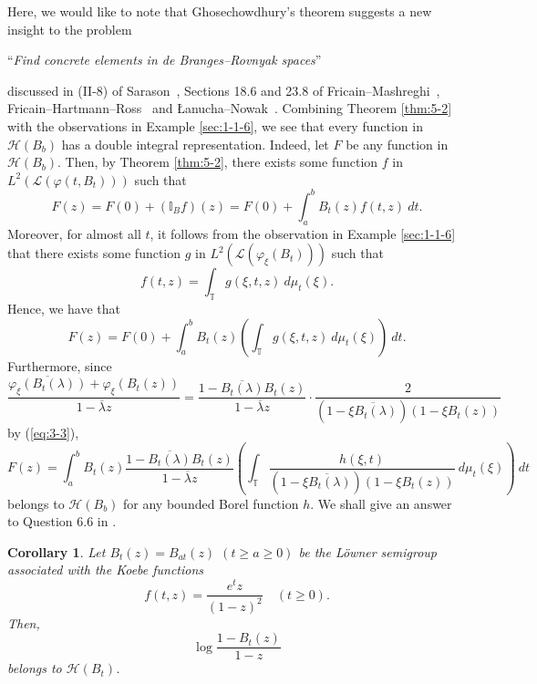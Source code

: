 \documentclass[12pt]{article}
\newtheorem{cor}[thm]{Corollary}
\numberwithin{equation}{section}
\newcommand{\cL}{{\mathcal L}}
\newcommand{\bT}{{\mathbb T}}
\newcommand{\bI}{{\mathbb I}}
\newcommand{\cH}{{\mathcal H}}
\newcommand{\lam}{\lambda}
\begin{document}
Here, we would like to note that 
Ghosechowdhury's theorem suggests a new insight to the problem 
\begin{center}
``\textit{Find concrete elements in de Branges--Rovnyak spaces}''
\end{center}
discussed in (II-8) of Sarason~\cite{Sarason}, Sections 18.6 and 23.8 of Fricain--Mashreghi~\cite{FM}, Fricain--Hartmann--Ross~\cite{FHR} and {\L}anucha--Nowak~\cite{LN}. 
Combining 
Theorem \ref{thm:5-2} with 
the observations in Example \ref{sec:1-1-6}, 
we see that every function in $\cH(B_{b})$ has a double integral representation. 
Indeed, let $F$ be any function in $\cH(B_b)$. 
Then, by Theorem \ref{thm:5-2}, 
there exists some function $f$ in $L^2(\cL(\varphi(t,B_{t})))$ such that  
\[
F(z)=F(0)+(\bI_B f)(z)=F(0)+\int_a^bB_t(z)f(t,z)\ dt. 
\]
Moreover, for almost all $t$, 
it follows from the observation in Example \ref{sec:1-1-6} 
that there exists some function $g$ in $L^2(\cL(\varphi_{\xi}(B_{t})))$ such that
\[
f(t,z)=\int_{\bT} g(\xi, t, z)\ d\mu_t(\xi).
\]
Hence, we have that 
\[
F(z)=F(0)+\int_a^bB_t(z)\left(\int_{\bT} g(\xi, t, z)\ d\mu_t(\xi)\right)\ dt. 
\]
Furthermore, 
since 
\[
\frac{\overline{\varphi_{\xi}(B_t(\lam))}+\varphi_{\xi}(B_t(z))}{1-\overline{\lam}z}
=\frac{1-\overline{B_t(\lam)}B_t(z)}{1-\overline{\lam}z}\cdot
\frac{2}{\left(1-\overline{\xi B_t(\lam)}\right)\left( 1-\xi B_t(z)\right)}
\]
by (\ref{eq:3-3}), 
\begin{equation}\label{eq:2-3}
F(z)=\int_a^b
B_t(z)\frac{1-\overline{B_t(\lam)}B_t(z)}{1-\overline{\lam}z}\left(\int_{\bT}\frac{h(\xi,t)}{\left(1-\overline{\xi B_t(\lam)}\right)\left(1-\xi B_t(z)\right)}\ d\mu_t(\xi)\right)\ dt
\end{equation}
belongs to $\cH(B_{b})$ for any bounded Borel function $h$. 
We shall give an answer to Question 6.6 in \cite{FHR}. 

\begin{cor}\label{cor:3-7}
Let $B_t(z)=B_{at}(z)$ $(t\geq a\geq 0)$ be the L\"{o}wner semigroup associated with the Koebe functions
\[
f(t,z)=\frac{e^tz}{(1-z)^2}\quad (t\geq 0).
\]
Then, 
\[
\log \frac{1-B_t(z)}{1-z}
\]
belongs to $\cH(B_t)$. 
\end{cor}
\end{document}
